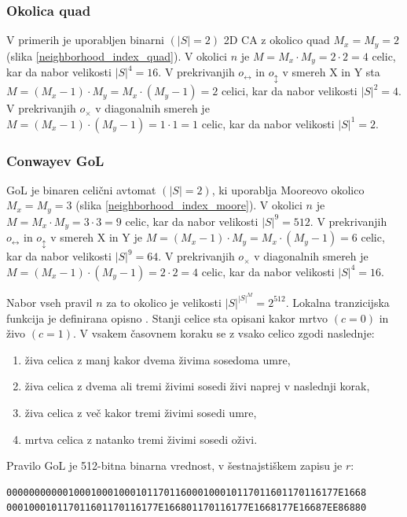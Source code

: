 \documentclass[12pt,a4paper,openany,twoside]{book}
\begin{document}
\subsubsection{Okolica quad}

V primerih je uporabljen binarni \((|S|=2)\) 2D CA z okolico quad \(M_x=M_y=2\) (slika \ref{neighborhood_index_quad}).
V okolici \(n\) je \(M=M_x \cdot M_y=2 \cdot 2=4\) celic, kar da nabor velikosti \(|S|^4=16\).
V prekrivanjih \(o_{\leftrightarrow}\) in \(o_{\updownarrow}\) v smereh X in Y
sta \(M=(M_x-1) \cdot M_y=M_x \cdot (M_y-1)=2\) celici, kar da nabor velikosti \(|S|^2=4\).
V prekrivanjih \(o_{\times}\) v diagonalnih smereh
je \(M=(M_x-1) \cdot (M_y-1)=1 \cdot 1=1\) celic, kar da nabor velikosti \(|S|^1=2\).

\subsubsection{Conwayev GoL}

GoL je binaren celični avtomat \((|S|=2)\), ki uporablja Mooreovo okolico \(M_x=M_y=3\) (slika \ref{neighborhood_index_moore}).
V okolici \(n\) je \(M=M_x \cdot M_y=3 \cdot 3=9\) celic, kar da nabor velikosti \(|S|^9=512\).
V prekrivanjih \(o_{\leftrightarrow}\) in \(o_{\updownarrow}\) v smereh X in Y
je \(M=(M_x-1) \cdot M_y=M_x \cdot (M_y-1)=6\) celic, kar da nabor velikosti \(|S|^9=64\).
V prekrivanjih \(o_{\times}\) v diagonalnih smereh
je \(M=(M_x-1) \cdot (M_y-1)=2 \cdot 2=4\) celic, kar da nabor velikosti \(|S|^4=16\).

Nabor vseh pravil \(n\) za to okolico je velikosti \(|S|^{|S|^{M}}=2^{512}\).
Lokalna tranzicijska funkcija je definirana opisno \cite{WikiGoL}.
Stanji celice sta opisani kakor mrtvo \((c=0)\) in živo \((c=1)\).
V vsakem časovnem koraku se z vsako celico zgodi naslednje:
\begin{enumerate}
\item živa celica z manj kakor dvema živima sosedoma umre,
\item živa celica z dvema ali tremi živimi sosedi živi naprej v naslednji korak,
\item živa celica z več kakor tremi živimi sosedi umre,
\item mrtva celica z natanko tremi živimi sosedi oživi.
\end{enumerate}
Pravilo GoL je 512-bitna binarna vrednost, v šestnajstiškem zapisu je \(r\):
\begin{verbatim}
00000000000100010001000101170116000100010117011601170116177E1668
000100010117011601170116177E166801170116177E1668177E16687EE86880
\end{verbatim}
\end{document}
